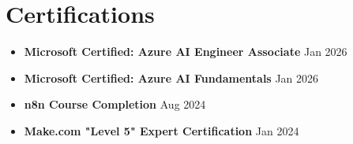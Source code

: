 \documentclass[letterpaper,11pt]{article}
\newcommand{\resumeSubHeadingListStart}{\begin{itemize}[leftmargin=0.0in, label={}, itemsep=-3pt]}
\newcommand{\resumeSubHeadingListEnd}{\end{itemize}}
\begin{document}
\section{Certifications}
\resumeSubHeadingListStart
\item\small{
\textbf{Microsoft Certified: Azure AI Engineer Associate} \hfill Jan 2026
}
\item\small{
\textbf{Microsoft Certified: Azure AI Fundamentals} \hfill Jan 2026
}
\item\small{
\textbf{n8n Course Completion} \hfill Aug 2024
}
\item\small{
\textbf{Make.com "Level 5" Expert Certification} \hfill Jan 2024
}
\resumeSubHeadingListEnd
\end{document}
